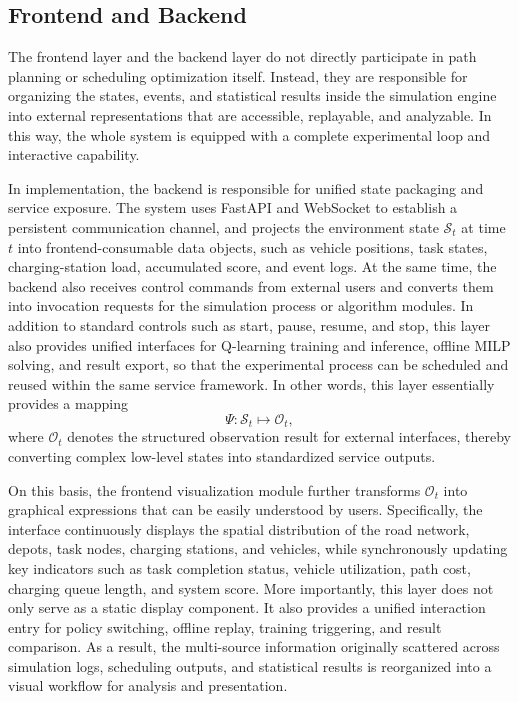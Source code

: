 \subsection{Frontend and Backend}

The frontend layer and the backend layer do not directly participate in path planning or scheduling optimization itself. Instead, they are responsible for organizing the states, events, and statistical results inside the simulation engine into external representations that are accessible, replayable, and analyzable. In this way, the whole system is equipped with a complete experimental loop and interactive capability.

In implementation, the backend is responsible for unified state packaging and service exposure. The system uses FastAPI and WebSocket to establish a persistent communication channel, and projects the environment state \(\mathcal{S}_t\) at time \(t\) into frontend-consumable data objects, such as vehicle positions, task states, charging-station load, accumulated score, and event logs. At the same time, the backend also receives control commands from external users and converts them into invocation requests for the simulation process or algorithm modules. In addition to standard controls such as start, pause, resume, and stop, this layer also provides unified interfaces for Q-learning training and inference, offline MILP solving, and result export, so that the experimental process can be scheduled and reused within the same service framework. In other words, this layer essentially provides a mapping
\[
\Psi: \mathcal{S}_t \mapsto \mathcal{O}_t,
\]
where \(\mathcal{O}_t\) denotes the structured observation result for external interfaces, thereby converting complex low-level states into standardized service outputs.

On this basis, the frontend visualization module further transforms \(\mathcal{O}_t\) into graphical expressions that can be easily understood by users. Specifically, the interface continuously displays the spatial distribution of the road network, depots, task nodes, charging stations, and vehicles, while synchronously updating key indicators such as task completion status, vehicle utilization, path cost, charging queue length, and system score. More importantly, this layer does not only serve as a static display component. It also provides a unified interaction entry for policy switching, offline replay, training triggering, and result comparison. As a result, the multi-source information originally scattered across simulation logs, scheduling outputs, and statistical results is reorganized into a visual workflow for analysis and presentation.
